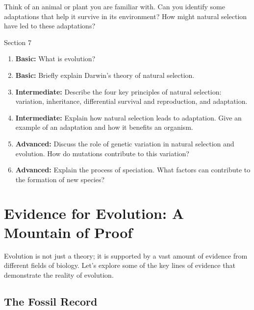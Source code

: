 \begin{marginnote}
\end{marginnote}

\begin{stopandthink}
Think of an animal or plant you are familiar with.  Can you identify some adaptations that help it survive in its environment? How might natural selection have led to these adaptations?
\end{stopandthink}


\begin{tieredquestions}{Section 7}

\begin{enumerate}
    \item \textbf{Basic:} What is evolution?
    \item \textbf{Basic:} Briefly explain Darwin's theory of natural selection.
    \item \textbf{Intermediate:} Describe the four key principles of natural selection: variation, inheritance, differential survival and reproduction, and adaptation.
    \item \textbf{Intermediate:} Explain how natural selection leads to adaptation. Give an example of an adaptation and how it benefits an organism.
    \item \textbf{Advanced:} Discuss the role of genetic variation in natural selection and evolution. How do mutations contribute to this variation?
    \item \textbf{Advanced:} Explain the process of speciation. What factors can contribute to the formation of new species?
\end{enumerate}

\end{tieredquestions}


\section{Evidence for Evolution: A Mountain of Proof}

Evolution is not just a theory; it is supported by a vast amount of evidence from different fields of biology.  Let's explore some of the key lines of evidence that demonstrate the reality of evolution.

\subsection{The Fossil Record}

